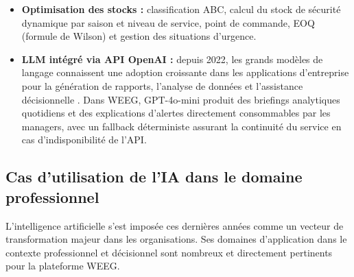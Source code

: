 \documentclass[a4paper,12pt]{report}
\begin{document}
\begin{itemize}
    \item \textbf{Optimisation des stocks :} classification ABC, calcul du stock
    de sécurité dynamique par saison et niveau de service, point de commande,
    EOQ (formule de Wilson) et gestion des situations d'urgence.

    \item \textbf{LLM intégré via API OpenAI :} depuis 2022, les grands modèles
    de langage connaissent une adoption croissante dans les applications
    d'entreprise pour la génération de rapports, l'analyse de données et
    l'assistance décisionnelle \cite{A4}\cite{A6}. Dans WEEG, GPT-4o-mini produit
    des briefings analytiques quotidiens et des explications d'alertes
    directement consommables par les managers, avec un fallback déterministe
    assurant la continuité du service en cas d'indisponibilité de l'API.
\end{itemize}

\subsection{Cas d'utilisation de l'IA dans le domaine professionnel}

L'intelligence artificielle s'est imposée ces dernières années comme un vecteur
de transformation majeur dans les organisations. Ses domaines d'application dans
le contexte professionnel et décisionnel sont nombreux et directement pertinents
pour la plateforme WEEG.
\end{document}
